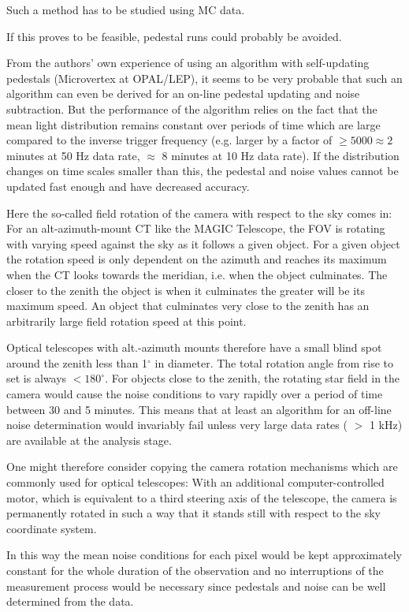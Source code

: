 \begin{itemize}
Such a method has to be studied using MC data.

If this proves to be feasible, pedestal runs could probably be avoided.

From the authors' own experience of using an algorithm with self-updating
pedestals (Microvertex at OPAL/LEP), it seems to be very probable that such
an algorithm can even be derived for an on-line pedestal updating and noise
subtraction. But the performance of the algorithm relies on the fact that
the mean light distribution remains constant over periods of time which are
large compared to the inverse trigger frequency (e.g. larger by a factor of $%
\geq 5000\approx 2$ minutes at 50 Hz data rate, $\approx $ 8 minutes at 10
Hz data rate). If the distribution changes on time scales smaller than this,
the pedestal and noise values cannot be updated fast enough and have
decreased accuracy.

Here the so-called field rotation of the camera with respect to the sky
comes in: For an alt-azimuth-mount CT like the MAGIC Telescope, the FOV is rotating with
varying speed against the sky as it follows a given object. For a given
object the rotation speed is only dependent on the azimuth and reaches its
maximum when the CT looks towards the meridian, i.e. when the object
culminates. The closer to the zenith the object is when it culminates the
greater will be its maximum speed. An object that culminates very close to
the zenith has an arbitrarily large field rotation speed at this point.

Optical telescopes with alt.-azimuth mounts therefore have a small blind
spot around the zenith less than 1$^{\circ }$ in diameter. The total
rotation angle from rise to set is always $<180^{\circ }$. For objects close
to the zenith, the rotating star field in the camera would cause the noise
conditions to vary rapidly over a period of time between 30 and 5 minutes.
This means that at least an algorithm for an off-line noise determination
would invariably fail unless very large data rates ( $>$ 1 kHz) are
available at the analysis stage.

One might therefore consider copying the camera rotation mechanisms which
are commonly used for optical telescopes: With an additional
computer-controlled motor, which is equivalent to a third steering axis of
the telescope, the camera is permanently rotated in such a way that it
stands still with respect to the sky coordinate system.

In this way the mean noise conditions for each pixel would be kept
approximately constant for the whole duration of the observation and no
interruptions of the measurement process would be necessary since pedestals
and noise can be well determined from the data.


\end{itemize}
